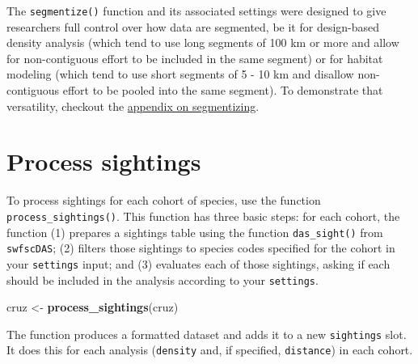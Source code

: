\documentclass[
]{book}
\newenvironment{Shaded}{\begin{snugshade}}{\end{snugshade}}
\newcommand{\DecValTok}[1]{\textcolor[rgb]{0.00,0.00,0.81}{#1}}
\newcommand{\KeywordTok}[1]{\textcolor[rgb]{0.13,0.29,0.53}{\textbf{#1}}}
\newcommand{\NormalTok}[1]{#1}
\newcommand{\OperatorTok}[1]{\textcolor[rgb]{0.81,0.36,0.00}{\textbf{#1}}}
\newcommand{\StringTok}[1]{\textcolor[rgb]{0.31,0.60,0.02}{#1}}
\begin{document}
The \texttt{segmentize()} function and its associated settings were designed to give researchers full control over how data are segmented, be it for design-based density analysis (which tend to use long segments of 100 km or more and allow for non-contiguous effort to be included in the same segment) or for habitat modeling (which tend to use short segments of 5 - 10 km and disallow non-contiguous effort to be pooled into the same segment). To demonstrate that versatility, checkout the \protect\hyperlink{segmentizing}{appendix on segmentizing}.

\hypertarget{process-sightings}{%
\section*{Process sightings}\label{process-sightings}}

To process sightings for each cohort of species, use the function \texttt{process\_sightings()}. This function has three basic steps: for each cohort, the function (1) prepares a sightings table using the function \texttt{das\_sight()} from \texttt{swfscDAS}; (2) filters those sightings to species codes specified for the cohort in your \texttt{settings} input; and (3) evaluates each of those sightings, asking if each should be included in the analysis according to your \texttt{settings}.

\begin{Shaded}
\begin{Highlighting}[]
\NormalTok{cruz <-}\StringTok{ }\KeywordTok{process_sightings}\NormalTok{(cruz)}
\end{Highlighting}
\end{Shaded}

The function produces a formatted dataset and adds it to a new \texttt{sightings} slot. It does this for each analysis (\texttt{density} and, if specified, \texttt{distance}) in each cohort.

\begin{Shaded}
\end{Shaded}
\end{document}
